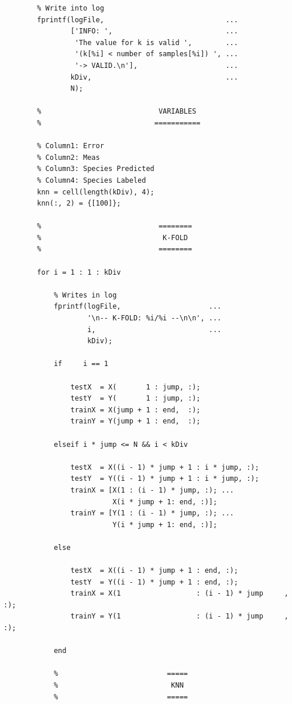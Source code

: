 \documentclass[11pt]{article}
\begin{document}
\begin{verbatim}
        % Write into log
        fprintf(logFile,                             ...
                ['INFO: ',                           ...
                 'The value for k is valid ',        ...
                 '(k[%i] < number of samples[%i]) ', ...
                 '-> VALID.\n'],                     ...
                kDiv,                                ...
                N);

        %                            VARIABLES
        %                           ===========

        % Column1: Error
        % Column2: Meas
        % Column3: Species Predicted
        % Column4: Species Labeled
        knn = cell(length(kDiv), 4);
        knn(:, 2) = {[100]};

        %                            ========
        %                             K-FOLD
        %                            ========

        for i = 1 : 1 : kDiv

            % Writes in log
            fprintf(logFile,                     ...
                    '\n-- K-FOLD: %i/%i --\n\n', ...
                    i,                           ...
                    kDiv);

            if     i == 1

                testX  = X(       1 : jump, :);
                testY  = Y(       1 : jump, :);
                trainX = X(jump + 1 : end,  :);
                trainY = Y(jump + 1 : end,  :);

            elseif i * jump <= N && i < kDiv 

                testX  = X((i - 1) * jump + 1 : i * jump, :);
                testY  = Y((i - 1) * jump + 1 : i * jump, :);
                trainX = [X(1 : (i - 1) * jump, :); ...
                          X(i * jump + 1: end, :)];
                trainY = [Y(1 : (i - 1) * jump, :); ...
                          Y(i * jump + 1: end, :)];

            else

                testX  = X((i - 1) * jump + 1 : end, :);
                testY  = Y((i - 1) * jump + 1 : end, :);
                trainX = X(1                  : (i - 1) * jump     , :);
                trainY = Y(1                  : (i - 1) * jump     , :);

            end

            %                          =====
            %                           KNN
            %                          =====


\end{verbatim}
\end{document}
